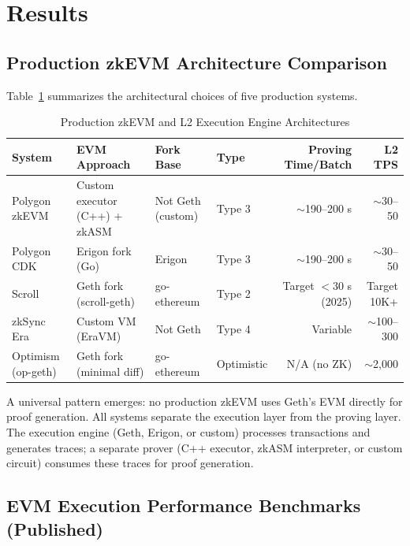 
\section{Results}

\subsection{Production zkEVM Architecture Comparison}

Table~\ref{tab:zkevm-comparison} summarizes the architectural choices of five
production systems.

\begin{table}[htbp]
\caption{Production zkEVM and L2 Execution Engine Architectures}
\label{tab:zkevm-comparison}
\centering
\begin{tabular}{llllrr}
\toprule
\textbf{System} & \textbf{EVM Approach} & \textbf{Fork Base} & \textbf{Type} & \textbf{Proving Time/Batch} & \textbf{L2 TPS} \\
\midrule
Polygon zkEVM & Custom executor (C++) + zkASM & Not Geth (custom) & Type 3 & ${\sim}$190--200 s & ${\sim}$30--50 \\
Polygon CDK & Erigon fork (Go) & Erigon & Type 3 & ${\sim}$190--200 s & ${\sim}$30--50 \\
Scroll & Geth fork (scroll-geth) & go-ethereum & Type 2 & Target $<$30 s (2025) & Target 10K+ \\
zkSync Era & Custom VM (EraVM) & Not Geth & Type 4 & Variable & ${\sim}$100--300 \\
Optimism (op-geth) & Geth fork (minimal diff) & go-ethereum & Optimistic & N/A (no ZK) & ${\sim}$2{,}000 \\
\bottomrule
\end{tabular}
\end{table}

A universal pattern emerges: no production zkEVM uses Geth's EVM directly for
proof generation. All systems separate the execution layer from the proving layer.
The execution engine (Geth, Erigon, or custom) processes transactions and generates
traces; a separate prover (C++ executor, zkASM interpreter, or custom circuit)
consumes these traces for proof generation.

\subsection{EVM Execution Performance Benchmarks (Published)}

